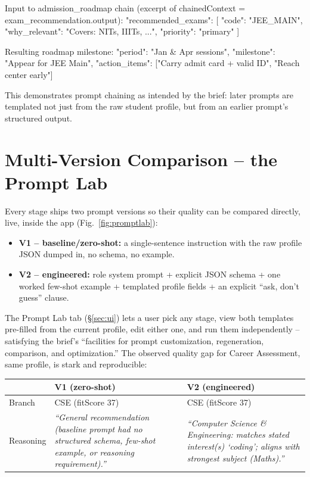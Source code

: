 \documentclass[11pt]{article}
\begin{document}
\begin{code}
Input to admission_roadmap chain (excerpt of chainedContext = exam_recommendation.output):
{ "recommended_exams": [
    {"code": "JEE_MAIN", "why_relevant": "Covers: NITs, IIITs, ...", "priority": "primary"}
]}

Resulting roadmap milestone:
{"period": "Jan & Apr sessions", "milestone": "Appear for JEE Main",
 "action_items": ["Carry admit card + valid ID", "Reach center early"]}
\end{code}

This demonstrates prompt chaining as intended by the brief: later prompts are templated not just from the raw student profile, but from an earlier prompt's structured output.

\section{Multi-Version Comparison -- the Prompt Lab}
\label{sec:versions}

Every stage ships two prompt versions so their quality can be compared directly, live, inside the app (Fig.~\ref{fig:promptlab}):
\begin{itemize}
\item \textbf{V1 -- baseline/zero-shot:} a single-sentence instruction with the raw profile JSON dumped in, no schema, no example.
\item \textbf{V2 -- engineered:} role system prompt + explicit JSON schema + one worked few-shot example + templated profile fields + an explicit ``ask, don't guess'' clause.
\end{itemize}

\noindent The Prompt Lab tab (\S\ref{sec:ui}) lets a user pick any stage, view both templates pre-filled from the current profile, edit either one, and run them independently -- satisfying the brief's ``facilities for prompt customization, regeneration, comparison, and optimization.'' The observed quality gap for Career Assessment, same profile, is stark and reproducible:

\begin{longtable}{|p{1.2cm}|p{6.4cm}|p{6.4cm}|}
\toprule
 & \textbf{V1 (zero-shot)} & \textbf{V2 (engineered)} \\
\midrule
\endfirsthead
\bottomrule
\endlastfoot
Branch & CSE (fitScore 37) & CSE (fitScore 37) \\
Reasoning & \emph{``General recommendation (baseline prompt had no structured schema, few-shot example, or reasoning requirement).''} & \emph{``Computer Science \& Engineering: matches stated interest(s) `coding'; aligns with strongest subject (Maths).''} \\
\end{longtable}
\end{document}
